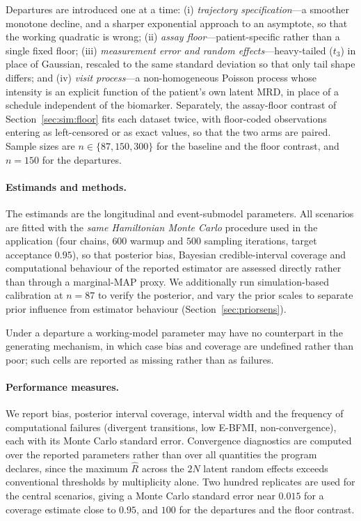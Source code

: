 \documentclass[11pt]{article}
\begin{document}
Departures are introduced one at a time: (i) \emph{trajectory
specification}---a smoother monotone decline, and a sharper exponential approach
to an asymptote, so that the working quadratic is wrong; (ii) \emph{assay
floor}---patient-specific rather than a single fixed floor; (iii)
\emph{measurement error and random effects}---heavy-tailed ($t_3$) in place of
Gaussian, rescaled to the same standard deviation so that only tail shape
differs; and (iv) \emph{visit process}---a non-homogeneous Poisson process whose
intensity is an explicit function of the patient's own latent MRD, in place of a
schedule independent of the biomarker. Separately, the assay-floor contrast of
Section~\ref{sec:sim:floor} fits each dataset twice, with floor-coded
observations entering as left-censored or as exact values, so that the two arms
are paired. Sample sizes are $n\in\{87,150,300\}$ for the baseline and the floor
contrast, and $n=150$ for the departures.

\paragraph{Estimands and methods.} The estimands are the longitudinal and
event-submodel parameters. All scenarios are fitted with the \emph{same
Hamiltonian Monte Carlo} procedure used in the application (four chains, $600$
warmup and $500$ sampling iterations, target acceptance $0.95$), so that
posterior bias, Bayesian credible-interval coverage and computational behaviour
of the reported estimator are assessed directly rather than through a
marginal-MAP proxy. We additionally run simulation-based calibration at $n=87$
to verify the posterior, and vary the prior scales to separate prior influence
from estimator behaviour (Section~\ref{sec:priorsens}).

Under a departure a working-model parameter may have no counterpart in the
generating mechanism, in which case bias and coverage are undefined rather than
poor; such cells are reported as missing rather than as failures.

\paragraph{Performance measures.} We report bias, posterior interval coverage,
interval width and the frequency of computational failures (divergent
transitions, low E-BFMI, non-convergence), each with its Monte Carlo standard
error. Convergence diagnostics are computed over the reported parameters rather
than over all quantities the program declares, since the maximum $\widehat R$
across the $2N$ latent random effects exceeds conventional thresholds by
multiplicity alone. Two hundred replicates are used for the central scenarios,
giving a Monte Carlo standard error near $0.015$ for a coverage estimate close
to $0.95$, and $100$ for the departures and the floor contrast.
\end{document}
